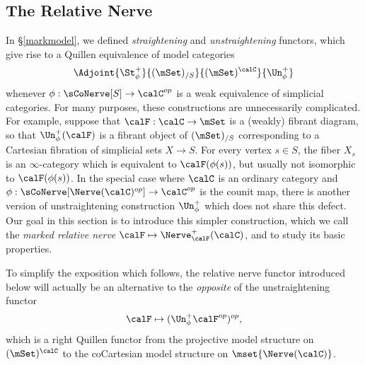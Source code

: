 \subsection{The Relative Nerve}\label{altstr}

In \S \ref{markmodel}, we defined {\em straightening} and {\em unstraightening} functors, which
give rise to a Quillen equivalence of model categories
$$ \Adjoint{\St^{+}_{\phi}}{(\mSet)_{/S}}{(\mSet)^{\calC}}{\Un^{+}_{\phi}}$$
whenever $\phi: \sCoNerve[S] \rightarrow \calC^{op}$ is a weak equivalence of simplicial categories.
For many purposes, these constructions are unnecessarily complicated. For example, suppose that
$\calF: \calC \rightarrow \mSet$ is a (weakly) fibrant diagram, so that $\Un^{+}_{\phi}(\calF)$ is a
fibrant object of $(\mSet)_{/S}$ corresponding to a Cartesian fibration of simplicial sets $X \rightarrow S$. For every vertex $s \in S$, the fiber $X_{s}$ is an $\infty$-category which is equivalent
to $\calF( \phi(s) )$, but usually not isomorphic to $\calF( \phi(s) )$. In the special case where
$\calC$ is an ordinary category and $\phi: \sCoNerve[ \Nerve(\calC)^{op} ] \rightarrow \calC^{op}$ is the counit map, there is another version of unstraightening construction $\Un^{+}_{\phi}$ which does not share this defect. Our goal in this section is to introduce this simpler construction, which we call
the {\it marked relative nerve} $\calF \mapsto \Nerve^{+}_{\calF}(\calC)$, and to study its basic properties.

\begin{remark}
To simplify the exposition which follows, the relative nerve functor introduced below will actually be
an alternative to the {\em opposite} of the unstraightening functor
$$ \calF \mapsto ( \Un^{+}_{\phi} \calF^{op} )^{op},$$
which is a right Quillen functor from the projective model structure on
$(\mSet)^{\calC}$ to the coCartesian model structure on $\mset{ \Nerve(\calC)}$. 
\end{remark}


